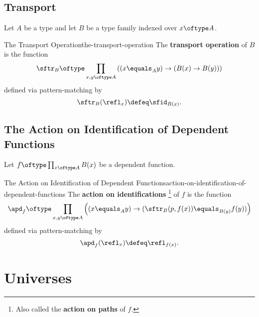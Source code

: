 \subsection{Transport}\label{subsection-martin-löf-type-theory-transport}
Let $A$ be a type and let $B$ be a type family indexed over $x\oftype A$.
\begin{definition}{The Transport Operation}{the-transport-operation}%
    The \textbf{transport operation} of $B$ is the function
    \[
        \sftr_{B}%
        \oftype%
        \prod_{x,y\oftype A}%
        \left(%
            (x\equals_{A}y)%
            \to%
            (B(x)\to B(y))%
        \right)%
    \]%
    defined via pattern-matching by
    \[
        \sftr_{B}(\refl_{x})%
        \defeq%
        \sfid_{B(x)}.%
    \]
\end{definition}
\subsection{The Action on Identification of Dependent Functions}\label{the-action-on-identification-of-dependent-functions}
Let $f\oftype\prod_{x\oftype A}B(x)$ be a dependent function.
\begin{definition}{The Action on Identification of Dependent Functions}{action-on-identification-of-dependent-functions}%
    The \textbf{action on identifications}%
    \footnote{%
        Also called the \textbf{action on paths} of $f$.
        \par\vspace*{\TCBBoxCorrection}
    } %
    of $f$ is the function
    \[
        \apd_{f}%
        \oftype%
        \prod_{x,y\oftype A}\left((x\equals_{A}y)\to(\sftr_{B}(p,f(x))\equals_{B(y)}f(y))\right)%
    \]%
    defined via pattern-matching by
    \[
        \apd_{f}(\refl_{x})%
        \defeq%
        \refl_{f(x)}.%
    \]%
\end{definition}
\section{Universes}\label{section-universes}
